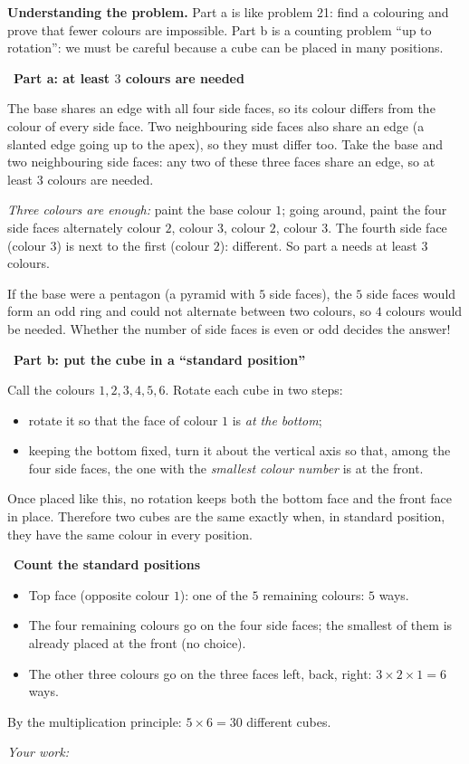 \documentclass[11pt]{article}
\newif\ifsol \solfalse
\newcommand{\probsol}[1]{%
  \begin{lrbox}{\solmeasure}\begin{minipage}{\dimexpr\linewidth-24pt\relax}#1\end{minipage}\end{lrbox}%
  \ifsol
    \begin{solbox}#1\end{solbox}%
  \else
    \setlength{\solht}{\dimexpr\ht\solmeasure+\dp\solmeasure+0.85cm\relax}%
    \ifdim\solht<1.35cm\setlength{\solht}{1.35cm}\fi
    \ifdim\solht>\StudentMaxWork\setlength{\solht}{\StudentMaxWork}\fi
    \begin{tcolorbox}[colback=white,colframe=Line,boxrule=0.8pt,arc=5pt,
      left=8pt,right=8pt,top=4pt,bottom=4pt,height=\solht]{\footnotesize\color{Slate}\itshape\WorkWord}\end{tcolorbox}%
  \fi}
\newlength{\StudentMaxWork}\setlength{\StudentMaxWork}{7.5cm}
\newcommand{\step}[2]{\par\smallskip\noindent{\bfseries\color{tmBlue!85!black}\StepWord~#1.}\ {\bfseries #2}\par\nopagebreak}
\def\WorkWord{Your work:}
\def\StepWord{Step}
\begin{document}
\probsol{
\textbf{Understanding the problem.} Part a is like problem 21: find a colouring and prove that fewer colours are impossible. Part b is a
counting problem ``up to rotation'': we must be careful because a cube can be placed in many positions.

\step{1}{Part a: at least $3$ colours are needed}
\begin{proofbox}The base shares an edge with all four side faces, so its colour differs from the colour of every side face. Two neighbouring
side faces also share an edge (a slanted edge going up to the apex), so they must differ too. Take the base and two neighbouring side faces:
any two of these three faces share an edge, so at least $3$ colours are needed.\end{proofbox}
\emph{Three colours are enough:} paint the base colour $1$; going around, paint the four side faces alternately colour $2$, colour $3$,
colour $2$, colour $3$. The fourth side face (colour $3$) is next to the first (colour $2$): different. So part a needs at least $3$ colours.
\begin{tipbox}If the base were a pentagon (a pyramid with $5$ side faces), the $5$ side faces would form an odd ring and could not alternate
between two colours, so $4$ colours would be needed. Whether the number of side faces is even or odd decides the answer!\end{tipbox}

\step{2}{Part b: put the cube in a ``standard position''}
Call the colours $1,2,3,4,5,6$. Rotate each cube in two steps:
\begin{itemize}[leftmargin=1.2em,itemsep=1pt,topsep=2pt]
\item rotate it so that the face of colour $1$ is \emph{at the bottom};
\item keeping the bottom fixed, turn it about the vertical axis so that, among the four side faces, the one with the \emph{smallest colour
number} is at the front.
\end{itemize}
Once placed like this, no rotation keeps both the bottom face and the front face in place. Therefore two cubes are the same exactly when,
in standard position, they have the same colour in every position.

\step{3}{Count the standard positions}
\begin{itemize}[leftmargin=1.2em,itemsep=1pt,topsep=2pt]
\item Top face (opposite colour $1$): one of the $5$ remaining colours: $5$ ways.
\item The four remaining colours go on the four side faces; the smallest of them is already placed at the front (no choice).
\item The other three colours go on the three faces left, back, right: $3\times2\times1=6$ ways.
\end{itemize}
By the multiplication principle: $5\times6=30$ different cubes.

}
\end{document}

